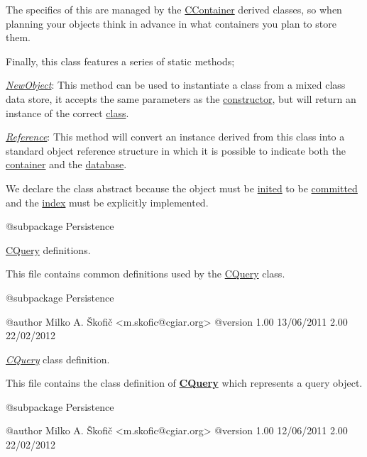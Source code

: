 The specifics of this are managed by the \hyperlink{class_c_container}{C\-Container} derived classes, so when planning your objects think in advance in what containers you plan to store them.

Finally, this class features a series of static methods;


\begin{DoxyItemize}
\item {\itshape \hyperlink{}{New\-Object}}\-: This method can be used to instantiate a class from a mixed class data store, it accepts the same parameters as the \hyperlink{}{constructor}, but will return an instance of the correct \hyperlink{}{class}. 
\item {\itshape \hyperlink{}{Reference}}\-: This method will convert an instance derived from this class into a standard object reference structure in which it is possible to indicate both the \hyperlink{}{container} and the \hyperlink{}{database}. 
\end{DoxyItemize}

We declare the class abstract because the object must be \hyperlink{}{inited} to be \hyperlink{}{committed} and the \hyperlink{}{index} must be explicitly implemented.

\begin{DoxyVerb}    @subpackage     Persistence\end{DoxyVerb}


\hyperlink{class_c_query}{C\-Query} definitions.

This file contains common definitions used by the \hyperlink{class_c_query}{C\-Query} class.

\begin{DoxyVerb}    @subpackage     Persistence

    @author         Milko A. Škofič <m.skofic@cgiar.org>
    @version        1.00 13/06/2011
                            2.00 22/02/2012\end{DoxyVerb}


{\itshape \hyperlink{class_c_query}{C\-Query}} class definition.

This file contains the class definition of {\bfseries \hyperlink{class_c_query}{C\-Query}} which represents a query object.

\begin{DoxyVerb}    @subpackage     Persistence

    @author         Milko A. Škofič <m.skofic@cgiar.org>
    @version        1.00 12/06/2011
                            2.00 22/02/2012\end{DoxyVerb}


